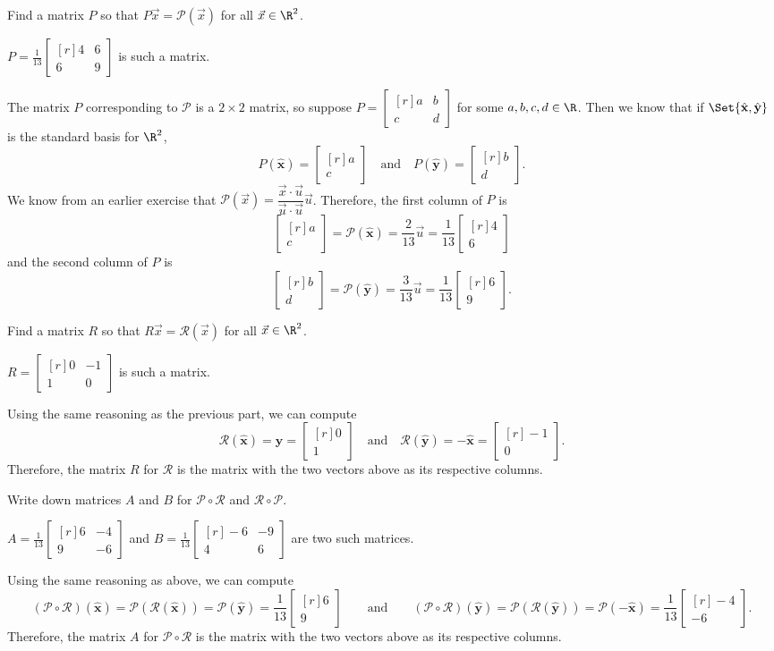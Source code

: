 \documentclass{problemset}
\newcommand{\xhat}{{\hat {\mathbf x}}}
\newcommand{\yhat}{{\hat {\mathbf y}}}
\newcommand{\mat}[1]{\begin{bmatrix*}[r]#1\end{bmatrix*}}
\begin{document}
	\begin{parts}
		\item Find a matrix $P$ so that $P\vec x=\mathcal P(\vec x)$ for all $\vec x\in\R^2$.
			\begin{solution}
				$P = \frac{1}{13}\mat{4&6\\6&9}$ is such a matrix.

				The matrix $P$ corresponding to $\mathcal P$ is a $2\times 2$ matrix,
				so suppose $P=\mat{a&b\\c&d}$ for some $a,b,c,d\in\R$. Then we
				know that if $\Set{\xhat,\yhat}$ is the standard basis for $\R^2$,
				\[
					P(\xhat)=\mat{a\\c} \quad \text{and} \quad P(\yhat)=\mat{b\\d}.
				\]
				We know from an earlier exercise that 
				$\mathcal P(\vec x)=\dfrac{\vec x\cdot\vec u}{\vec u\cdot\vec u}\vec u$.
				Therefore, the first column of $P$ is
				\[
					\mat{a\\c}=\mathcal P(\xhat)=\frac{2}{13}\vec u=\frac{1}{13}\mat{4\\6}
				\]
				and the second column of $P$ is
				\[
					\mat{b\\d}=\mathcal P(\yhat)=\frac{3}{13}\vec u=\frac{1}{13}\mat{6\\9}.
				\]
			\end{solution}
		\item Find a matrix $R$ so that $R\vec x=\mathcal R(\vec x)$ for all $\vec x\in\R^2$.
			\begin{solution}
				$R=\mat{0&-1\\1&0}$ is such a matrix. 

				Using the same reasoning as the previous part, we can compute
				\[
					\mathcal R(\xhat)=\yhat=\mat{0\\1}
					\quad \text{and} \quad
					\mathcal R(\yhat)=-\xhat=\mat{-1\\0}.
				\]
				Therefore, the matrix $R$ for $\mathcal R$ is the matrix with the
				two vectors above as its respective columns.
			\end{solution}
		\item Write down matrices $A$ and $B$ for $\mathcal P\circ\mathcal R$ 
			and $\mathcal R\circ \mathcal P$.
			\begin{solution}
				$A=\frac{1}{13}\mat{6&-4\\9&-6}$ and $B=\frac{1}{13}\mat{-6&-9\\4&6}$
				are two such matrices.

				Using the same reasoning as above, we can compute
				\[
					(\mathcal P\circ\mathcal R)(\xhat)
					=\mathcal P(\mathcal R(\xhat))
					=\mathcal P(\yhat)
					=\frac{1}{13}\mat{6\\9}
					\qquad \text{and} \qquad
					(\mathcal P\circ\mathcal R)(\yhat)
					=\mathcal P(\mathcal R(\yhat))
					=\mathcal P(-\xhat)
					=\frac{1}{13}\mat{-4\\-6}.
				\]
				Therefore, the matrix $A$ for $\mathcal P\circ\mathcal R$ is the
				matrix with the two vectors above as its respective columns. 


\end{solution}
\end{parts}
\end{document}
